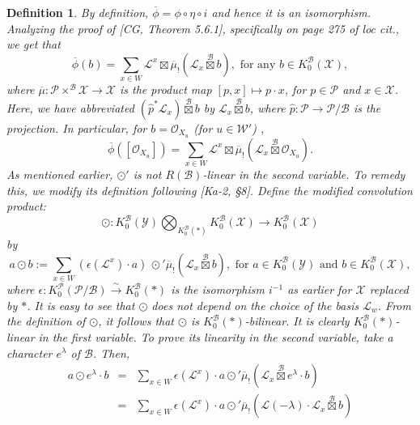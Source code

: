 \documentclass{article}
\newtheorem{definition}[theorem]{Definition}
\def\L{\mathcal{L}}
\def\P{\mathcal{P}}
\def\X{\mathcal{X}}
\def\B{\mathcal{B}}
\def\W{\mathcal{W}}
\def\Y{\mathcal{Y}}
\begin{document}
\begin{definition}
{By definition, $\overline{\phi}=\phi\circ \eta \circ i$ and hence it is an isomorphism. Analyzing the proof of [CG, Theorem 5.6.1], specifically on page 275 of loc cit., we get that 
\begin{equation}\label{4.8.1}
\overline{\phi} (b)=\sum_{x\in W} \L^x \boxtimes \overline{\mu}_! \left( \L_x \overset{\B}{\boxtimes} b\right), \mbox{ for any } b\in K_0^\B \left(\X\right),
\end{equation}
where $\overline{\mu}:\P\times^\B \X\rightarrow \X$ is the product map $[p,x]\mapsto p\cdot x$, for $p\in\P$ and $x\in \X$. Here, we have  abbreviated $\left(\hat{p}^* \L_x \right) \overset{\B}{\boxtimes} b$
by  $\L_x\overset{\B}{\boxtimes} b$, where $\hat{p}:\P\rightarrow \P/\B$ is the projection.
In particular,  for $b=\mathcal{O}_{X_u}$ (for $u\in \W'$) ,
\begin{equation}\label{4.8.2}
\overline{\phi} \left(\left[ \mathcal{O}_{X_u}\right]\right) = \sum_{x\in W} \L^x \boxtimes \overline{\mu}_! \left( \L_x \overset{\B}{\boxtimes}  \mathcal{O}_{X_u}\right). 
\end{equation}
As mentioned earlier, $\odot'$ is \textit{not} $R(\B)$-linear in the second variable. To remedy this, we modify its definition following [Ka-2, \S8].
Define the \textit{modified convolution product}: 
$$
\odot :K_0^\B \left( \Y\right) \bigotimes _{K_0^\B(*)} K_0^\B \left( \X\right) \rightarrow K_0^\B \left ( \X\right)
$$
by 
\begin{equation}\label{4.8.3}
a\odot b := \sum_{x\in W} \left(\epsilon \left(\L^x\right) \cdot a\right) \, \odot' \overline{\mu}_! \left(\L_x \overset{\B}{\boxtimes} b\right), \mbox{ for  } a\in K_0^\B\left(\Y\right) \mbox{ and } b \in K_0^\B\left(\X\right),
\end{equation}
where $\epsilon:K_0^\P \left(\P/\B\right)\overset{\sim}{\rightarrow}K_0^\B (*)$ is the isomorphism $i^{-1}$ as earlier  for $\X$ replaced by $*$. It is easy to see that $\odot$ does not depend on the choice of the basis $\L_w$. From the definition of $\odot$, it follows that $\odot$ is $K_0^\B(*)$-bilinear. It is clearly $K_0^\B(*)$-linear in the first variable. To prove its linearity in the second variable, take a character $e^\lambda$ of $\B$. Then, 
\begin{eqnarray*}
a\odot e^\lambda \cdot b &=& \sum_{x\in W}\epsilon \left(\L^x\right)\cdot a \odot' \overline{\mu}_!\left(\L_x \overset{\B}{\boxtimes} e^\lambda \cdot b\right)\\
&=& \sum_{x\in W}\epsilon \left(\L^x\right)\cdot a \odot' \overline{\mu}_!\left(\L(-\lambda)\cdot \L_x \overset{\B}{\boxtimes} b\right)\\

\end{eqnarray*}}
\end{definition}
\end{document}
